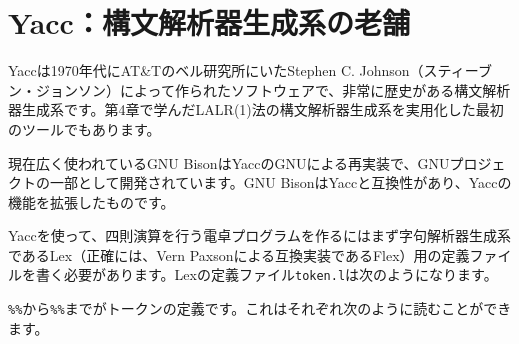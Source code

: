 \section{Yacc：構文解析器生成系の老舗}

Yaccは1970年代にAT\&Tのベル研究所にいたStephen C.
Johnson（スティーブン・ジョンソン）によって作られたソフトウェアで、非常に歴史がある構文解析器生成系です。第4章で学んだLALR(1)法の構文解析器生成系を実用化した最初のツールでもあります。

現在広く使われているGNU
BisonはYaccのGNUによる再実装で、GNUプロジェクトの一部として開発されています。GNU
BisonはYaccと互換性があり、Yaccの機能を拡張したものです。

Yaccを使って、四則演算を行う電卓プログラムを作るにはまず字句解析器生成系であるLex（正確には、Vern
Paxsonによる互換実装であるFlex）用の定義ファイルを書く必要があります。Lexの定義ファイル\texttt{token.l}は次のようになります。


\texttt{\%\%}から\texttt{\%\%}までがトークンの定義です。これはそれぞれ次のように読むことができます。

